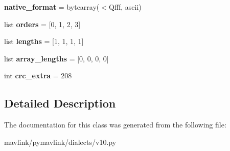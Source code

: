 \begin{DoxyCompactItemize}
{\bfseries native\+\_\+format} = bytearray(\textquotesingle{}$<$Qfff\textquotesingle{}, \textquotesingle{}ascii\textquotesingle{})
\item 
\mbox{\label{classpymavlink_1_1dialects_1_1v10_1_1MAVLink__vision__speed__estimate__message_a542ef89fe4fadfc88faf5cb950bc49c4}} 
list {\bfseries orders} = \mbox{[}0, 1, 2, 3\mbox{]}
\item 
\mbox{\label{classpymavlink_1_1dialects_1_1v10_1_1MAVLink__vision__speed__estimate__message_a3f3deae112335a6f213872f7e53f0673}} 
list {\bfseries lengths} = \mbox{[}1, 1, 1, 1\mbox{]}
\item 
\mbox{\label{classpymavlink_1_1dialects_1_1v10_1_1MAVLink__vision__speed__estimate__message_a6c3fc15063df5af5be878cdd49d888b6}} 
list {\bfseries array\+\_\+lengths} = \mbox{[}0, 0, 0, 0\mbox{]}
\item 
\mbox{\label{classpymavlink_1_1dialects_1_1v10_1_1MAVLink__vision__speed__estimate__message_a13bacf4b898b2a3d7087a8e09958723d}} 
int {\bfseries crc\+\_\+extra} = 208
\end{DoxyCompactItemize}


\subsection{Detailed Description}
\begin{DoxyVerb}\end{DoxyVerb}
 

The documentation for this class was generated from the following file\+:\begin{DoxyCompactItemize}
\item 
mavlink/pymavlink/dialects/v10.\+py\end{DoxyCompactItemize}
